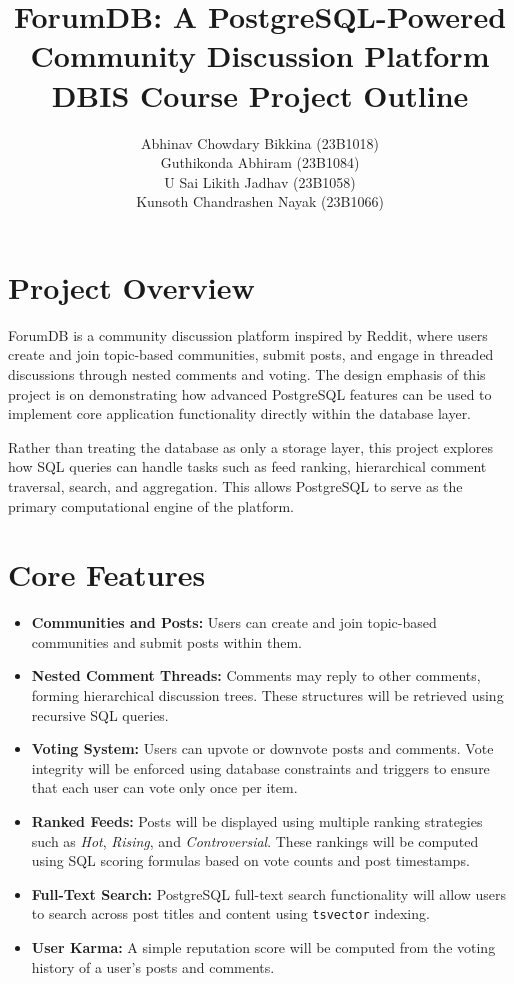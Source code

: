 \documentclass[11pt,a4paper]{article}
\title{\textbf{ForumDB: A PostgreSQL-Powered Community Discussion Platform} \\ \Large \textbf{DBIS Course Project Outline}}
\author{
Abhinav Chowdary Bikkina (23B1018) \\
Guthikonda Abhiram (23B1084) \\
U Sai Likith Jadhav (23B1058) \\ 
Kunsoth Chandrashen Nayak (23B1066)
}
\date{}
\begin{document}
\maketitle
\vspace{-1em}

\section*{Project Overview}

ForumDB is a community discussion platform inspired by Reddit, where users create and join topic-based communities, submit posts, and engage in threaded discussions through nested comments and voting. The design emphasis of this project is on demonstrating how advanced PostgreSQL features can be used to implement core application functionality directly within the database layer.

Rather than treating the database as only a storage layer, this project explores how SQL queries can handle tasks such as feed ranking, hierarchical comment traversal, search, and aggregation. This allows PostgreSQL to serve as the primary computational engine of the platform.

\section*{Core Features}

\begin{itemize}[noitemsep, topsep=4pt]
    \item \textbf{Communities and Posts:} Users can create and join topic-based communities and submit posts within them.

    \item \textbf{Nested Comment Threads:} Comments may reply to other comments, forming hierarchical discussion trees. These structures will be retrieved using recursive SQL queries.

    \item \textbf{Voting System:} Users can upvote or downvote posts and comments. Vote integrity will be enforced using database constraints and triggers to ensure that each user can vote only once per item.

    \item \textbf{Ranked Feeds:} Posts will be displayed using multiple ranking strategies such as \textit{Hot}, \textit{Rising}, and \textit{Controversial}. These rankings will be computed using SQL scoring formulas based on vote counts and post timestamps.

    \item \textbf{Full-Text Search:} PostgreSQL full-text search functionality will allow users to search across post titles and content using \texttt{tsvector} indexing.

    \item \textbf{User Karma:} A simple reputation score will be computed from the voting history of a user's posts and comments.
\end{itemize}
\end{document}

